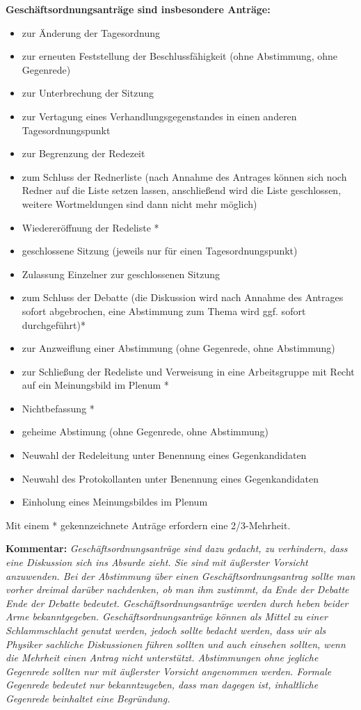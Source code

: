 \begin{enumerate}
    \textbf{Geschäftsordnungsanträge sind insbesondere Anträge:}
    \begin{itemize}
      \item zur Änderung der Tagesordnung
      \item zur erneuten Feststellung der Beschlussfähigkeit (ohne Abstimmung, ohne Gegenrede)
      \item zur Unterbrechung der Sitzung
      \item zur Vertagung eines Verhandlungsgegenstandes in einen anderen Tagesordnungspunkt
      \item zur Begrenzung der Redezeit
      \item zum Schluss der Rednerliste (nach Annahme des Antrages können sich noch Redner auf die Liste
            setzen lassen, anschließend wird die Liste geschlossen, weitere Wortmeldungen sind dann nicht
            mehr möglich)
      \item Wiedereröffnung der Redeliste *
      \item geschlossene Sitzung (jeweils nur für einen Tagesordnungspunkt)
      \item Zulassung Einzelner zur geschlossenen Sitzung
      \item zum Schluss der Debatte (die Diskussion wird nach Annahme des Antrages sofort abgebrochen, eine
            Abstimmung zum Thema wird ggf. sofort durchgeführt)*
      \item zur Anzweiflung einer Abstimmung (ohne Gegenrede, ohne Abstimmung)
      \item zur Schließung der Redeliste und Verweisung in eine Arbeitsgruppe mit Recht auf ein Meinungsbild im Plenum *
      \item Nichtbefassung *
      \item geheime Abstimung (ohne Gegenrede, ohne Abstimmung)
      \item Neuwahl der Redeleitung unter Benennung eines Gegenkandidaten
      \item Neuwahl des Protokollanten unter Benennung eines Gegenkandidaten
      \item Einholung eines Meinungsbildes im Plenum
    \end{itemize}
    Mit einem * gekennzeichnete Anträge erfordern eine 2/3-Mehrheit.
\end{enumerate}

\textbf{Kommentar:} \textit{\footnotesize Geschäftsordnungsanträge
sind dazu gedacht, zu verhindern, dass eine Diskussion sich ins
Absurde zieht. Sie sind mit äußerster Vorsicht anzuwenden. Bei der
Abstimmung über einen Geschäftsordnungsantrag sollte man vorher
dreimal darüber nachdenken, ob man ihm zustimmt, da Ende der Debatte
Ende der Debatte bedeutet. Geschäftsordnungsanträge werden durch
heben beider Arme bekanntgegeben. Geschäftsordnungsanträge können
als Mittel zu einer Schlammschlacht genutzt werden, jedoch sollte
bedacht werden, dass wir als Physiker sachliche Diskussionen führen
sollten und auch einsehen sollten, wenn die Mehrheit einen Antrag
nicht unterstützt. Abstimmungen ohne jegliche Gegenrede sollten nur
mit äußerster Vorsicht angenommen werden. Formale Gegenrede bedeutet
nur bekanntzugeben, dass man dagegen ist,
inhaltliche Gegenrede beinhaltet eine Begründung.}

